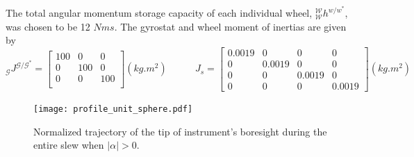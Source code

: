 \documentclass[journal ]{new-aiaa}
\begin{document}

The total angular momentum storage capacity of each individual wheel, $_\mathcal{W}^\mathcal{W}h^{w/w^{*}}$, was chosen to be 12 $Nms$. The gyrostat and wheel moment of inertias are given by 
\begin{equation}
 _\mathcal{G}J^{\mathcal{G/G^*}} = \begin{bmatrix} 100 & 0 & 0 \\ 0 & 100 & 0 \\ 0 & 0 & 100 \\ \end{bmatrix} ( kg.m^2)
 ~~~~~~~~~~~~~ J_{s} = \begin{bmatrix} 0.0019 & 0 & 0&0 \\ 0 & 0.0019 &0& 0 \\ 0 & 0 & 0.0019&0 \\0&0&0&0.0019 \end{bmatrix}( kg.m^2) 
\end{equation}

\begin{figure}[hbt!]
	\centering
		\texttt{[image: profile\_unit\_sphere.pdf]}
		\caption{Normalized trajectory of the tip of instrument's boresight during the entire slew when $|\alpha|>0$.}
		\label{fig:phi1_phi2_phi3}
\end{figure}
\end{document}
